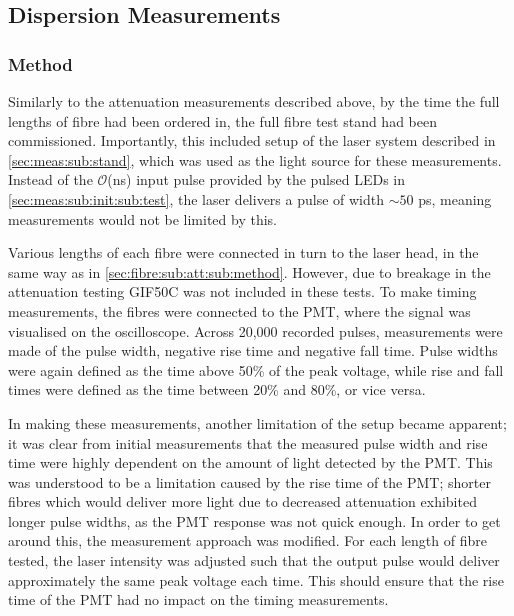 \documentclass[a4paper,11pt]{article}
\let\oldsim\sim
\renewcommand{\sim}{{\oldsim}}
\begin{document}
\subsection{Dispersion Measurements}

\subsubsection{Method}

Similarly to the attenuation measurements described above, by the time the full lengths of fibre had been ordered in, the full fibre test stand had been commissioned. Importantly, this included setup of the laser system described in \cref{sec:meas:sub:stand}, which was used as the light source for these measurements. Instead of the $\mathcal{O}$(ns) input pulse provided by the pulsed LEDs in \cref{sec:meas:sub:init:sub:test}, the laser delivers a pulse of width $\sim50$ ps, meaning measurements would not be limited by this.

Various lengths of each fibre were connected in turn to the laser head, in the same way as in \cref{sec:fibre:sub:att:sub:method}. However, due to breakage in the attenuation testing GIF50C was not included in these tests. To make timing measurements, the fibres were connected to the PMT, where the signal was visualised on the oscilloscope. Across 20,000 recorded pulses, measurements were made of the pulse width, negative rise time and negative fall time. Pulse widths were again defined as the time above 50\% of the peak voltage, while rise and fall times were defined as the time between 20\% and 80\%, or vice versa.

In making these measurements, another limitation of the setup became apparent; it was clear from initial measurements that the measured pulse width and rise time were highly dependent on the amount of light detected by the PMT. This was understood to be a limitation caused by the rise time of the PMT; shorter fibres which would deliver more light due to decreased attenuation exhibited longer pulse widths, as the PMT response was not quick enough. In order to get around this, the measurement approach was modified. For each length of fibre tested, the laser intensity was adjusted such that the output pulse would deliver approximately the same peak voltage each time. This should ensure that the rise time of the PMT had no impact on the timing measurements.
\end{document}
